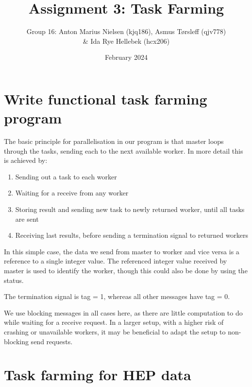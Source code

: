 \documentclass{article}
\title{Assignment 3: Task Farming}
\author{\auth Group 16: Anton Marius Nielsen (kjq186), Asmus Tørsleff (qjv778)\\ \auth\& Ida Rye Hellebek (hcx206)}
\date{\auth February 2024}
\begin{document}
\maketitle

\section{Write functional task farming program}



The basic principle for parallelisation in our program is that master loops through the tasks, sending each to the next available worker. In more detail this is achieved by:

\begin{enumerate}
    \item Sending out a task to each worker
    \item Waiting for a receive from any worker
    \item Storing result and sending new task to newly returned worker, until all tasks are sent
    \item Receiving last results, before sending a termination signal to returned workers
\end{enumerate}

In this simple case, the data we send from master to worker and vice versa is a reference to a single integer value. The referenced integer value received by master is used to identify the worker, though this could also be done by using the status.

The termination signal is tag = 1, whereas all other messages have tag = 0. 

We use blocking messages in all cases here, as there are little computation to do while waiting for a receive request. In a larger setup, with a higher risk of crashing or unavailable workers, it may be beneficial to adapt the setup to non-blocking send requests.


\section{Task farming for HEP data}
\end{document}
